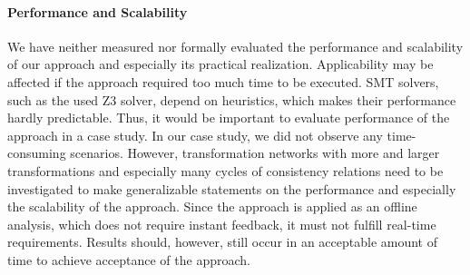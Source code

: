 \paragraph{Performance and Scalability}
We have neither measured nor formally evaluated the performance and scalability of our approach and especially its practical realization.
Applicability may be affected if the approach required too much time to be executed.
\gls{SMT} solvers, such as the used Z3 solver, depend on heuristics, which makes their performance hardly predictable.
Thus, it would be important to evaluate performance of the approach in a case study.
In our case study, %
we did not observe any time-consuming scenarios.
However, transformation networks with more and larger transformations and especially many cycles of consistency relations need to be investigated to make generalizable statements on the performance and especially the scalability of the approach.
Since the approach is applied as an offline analysis, which does not require instant feedback, it must not fulfill real-time requirements.
Results should, however, still occur in an acceptable amount of time to achieve acceptance of the approach.










